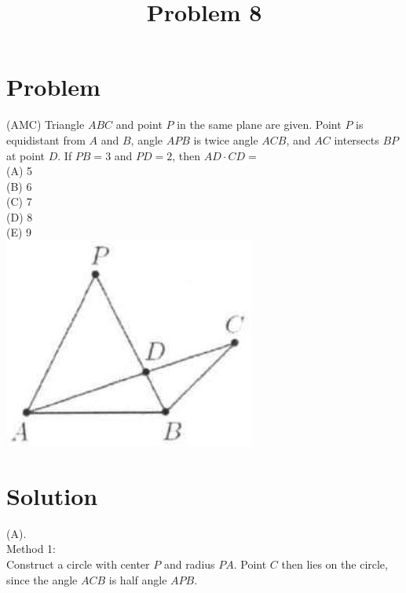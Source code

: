 \documentclass{article}
\title{Problem 8}
\date{}
\begin{document}
\maketitle

\section*{Problem}
(AMC) Triangle \(A B C\) and point \(P\) in the same plane are given. Point \(P\) is equidistant from \(A\) and \(B\), angle \(A P B\) is twice angle \(A C B\), and \(A C\) intersects \(B P\) at point \(D\). If \(P B=3\) and \(P D=2\), then \(A D \cdot C D=\)\\
(A) 5\\
(B) 6\\
(C) 7\\
(D) 8\\
(E) 9\\
\centering
\includegraphics[width=\textwidth]{images/207(2).jpg}

\section*{Solution}
(A).\\
Method 1:\\
Construct a circle with center \(P\) and radius \(P A\). Point \(C\) then lies on the circle, since the angle \(A C B\) is half angle \(A P B\).
\end{document}
